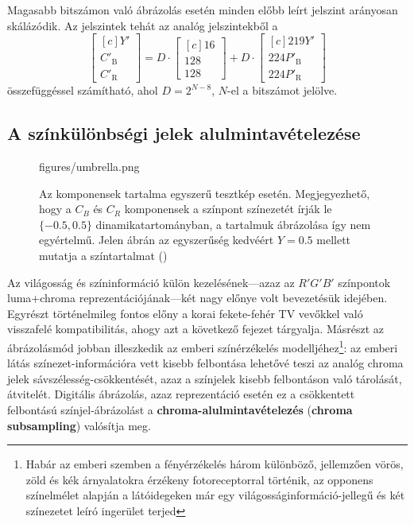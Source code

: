 Magasabb bitszámon való ábrázolás esetén minden előbb leírt jelszint arányosan skálázódik.
Az \ycbcr jelszintek tehát az \ypbpr analóg jelszintekből a 
\begin{equation}
\begin{bmatrix}[c]
       Y' \\[0.3em]
       C'_{\mathrm{B}} \\[0.3em]
       C'_{\mathrm{R}} \end{bmatrix}
       =
D\cdot
\begin{bmatrix}[c]
       16 \\[0.3em]
       128 \\[0.3em]
       128 \end{bmatrix}
+
D\cdot
\begin{bmatrix}[c]
       219 Y' \\[0.3em]
       224 P'_\mathrm{B} \\[0.3em]
       224 P'_{\mathrm{R}} \end{bmatrix}
\end{equation}
összefüggéssel számítható, ahol $D = 2^{N-8}$, $N$-el a bitszámot jelölve.

\subsection{A színkülönbségi jelek alulmintavételezése}

\begin{figure}[]
	\centering
	\begin{overpic}[width = 1\columnwidth ]{figures/umbrella.png}
 	\end{overpic}
	\caption{Az \ycbcr komponensek tartalma egyszerű tesztkép esetén.
	Megjegyezhető, hogy a $C_B$ és $C_R$ komponensek a színpont színezetét írják le $\lbrace -0.5, 0.5\rbrace$ dinamikatartományban, a tartalmuk ábrázolása így nem egyértelmű.
	Jelen ábrán az egyszerűség kedvéért $Y=0.5$ mellett mutatja a színtartalmat ()}
	\label{Fig:umbrella}
\end{figure}
%
Az világosság és színinformáció külön kezelésének---azaz az $R'G'B'$ színpontok luma+chroma reprezentációjának---két nagy előnye volt bevezetésük idejében.
Egyrészt történelmileg fontos előny a korai fekete-fehér TV vevőkkel való visszafelé kompatibilitás, ahogy azt a következő fejezet tárgyalja.
Másrészt az ábrázolásmód jobban illeszkedik az emberi színérzékelés modelljéhez\footnote{Habár az emberi szemben a fényérzékelés három különböző, jellemzően vörös, zöld és kék árnyalatokra érzékeny fotoreceptorral történik, az opponens színelmélet alapján a látóidegeken már egy világosságinformáció-jellegű és két színezetet leíró ingerület terjed}:
az emberi látás színezet-információra vett kisebb felbontása lehetővé teszi az analóg chroma jelek sávszélesség-csökkentését, azaz a színjelek kisebb felbontáson való tárolását, átvitelét.
Digitális ábrázolás, azaz \ycbcr reprezentáció esetén ez a csökkentett felbontású színjel-ábrázolást a \textbf{chroma-alulmintavételezés} (\textbf{chroma subsampling}) valósítja meg.

